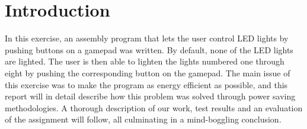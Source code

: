 \section{Introduction}

In this exercise, an assembly program that lets the user control LED lights by pushing buttons on a gamepad was written.
By default, none of the LED lights are lighted.
The user is then able to lighten the lights numbered one through eight by pushing the corresponding button on the gamepad.
The main issue of this exercise was to make the program as energy efficient as possible, and this report will in detail describe how this problem was solved through power saving methodologies.
A thorough description of our work, test results and an evaluation of the assignment will follow, all culminating in a mind-boggling conclusion.

